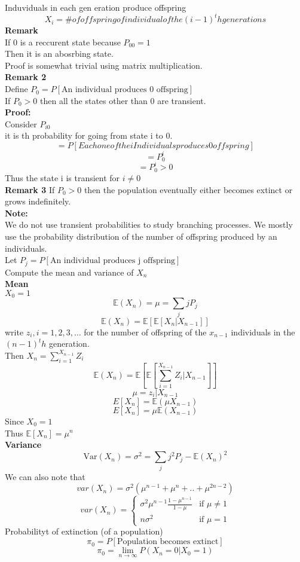 \documentclass{article}
\newcommand{\expec}{\mathds{E}}
\newcommand{\var}{\text{Var}}
\begin{document}
Induviduals in each gen eration produce offspring
$$X_i = \# of offspring of individual of the (i-1)^th generations$$
\textbf{Remark}\\
If 0 is a reccurent state because $P_{00} = 1$\\
Then it is an abosrbing state.\\
Proof is somewhat trivial using matrix multiplication.\\
\textbf{Remark 2}\\
Define $P_0 = P[\text{An individual produces 0 offspring}]$ \\
If $P_0 >0$ then all the states other than 0 are transient.\\
\textbf{Proof:}\\
Consider $P_{i0}$\\
it is th probability for going from state i to 0.\\
$$= P[Each one of the i Individuals produces 0 offspring]$$
$$= P_0^i$$
$$= P_0^i > 0$$
Thus the state i is transient for $i \neq 0$\\
\textbf{Remark 3}
If $P_0 > 0 $ then the population eventually either becomes extinct or grows indefinitely.\\
\textbf{Note:}\\
We do not use transient probabilities to study branching processes. We mostly use the probability distribution of the number of offspring produced by an individuals. \\
Let $P_j = P[\text{An individual produces j offspring}]$\\
Compute the mean and variance of $X_n$\\
\textbf{Mean}\\
$X_0 = 1$
$$\expec(X_n) = \mu = \sum_{j} j P_j$$
$$\expec(X_n) = \expec[\expec[X_n|X_{n-1}]]$$
write $z_i, i = 1,2,3, \dots$ for the number of offspring of the $x_{n-1}$ individuals in the $(n-1)^th$ generation.\\
Then $X_n = \sum_{i=1}^{X_{n-1}} Z_i$\\
$$\expec(X_n) = \expec[\expec[\sum_{i=1}^{X_{n-1}} Z_i| X_{n-1}]]$$
$$ \mu = z_i | X_{n-1} $$
$$ E[X_n]= \expec( \mu X_{n-1})$$
$$ E[X_n] = \mu \expec(X_{n-1})$$
Since $X_0 = 1$\\
Thus $\expec[X_n] = \mu^n$\\
\textbf{Variance}
$$\var(X_n) = \sigma^2 = \sum_{j} j^2 P_j - \expec(X_n)^2$$
We can also note that 
$$ var(X_n) = \sigma^2(\mu^{n-1} + \mu^{n} + .. + \mu^{2n-2})$$
$$ var(X_n) = \begin{cases}
    \sigma^2 \mu^{n-1} \frac{1 - \mu^{n-1}}{1 - \mu} & \text{if } \mu \neq 1\\
    n \sigma^2  & \text{if } \mu = 1 
\end{cases}
$$
Probabilityt of extinction (of a population) \\
$$\pi_0 = P[\text{Population becomes extinct}]$$
$$\pi_0 = \lim_{n \to \infty} P(X_n = 0|X_0 = 1)$$
\end{document}
